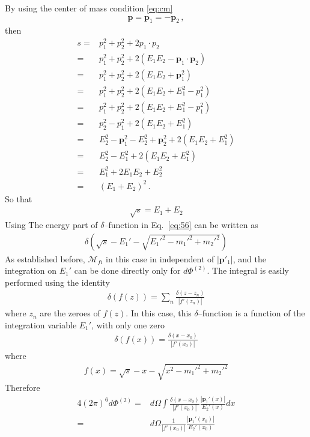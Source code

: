By using the center of mass condition \eqref{eq:cm}
\begin{align}
  \mathbf{p}=\mathbf{p}_1=-\mathbf{p}_2\,,
\end{align}
then
\begin{align}
   s=& p_1^2+p_2^2+2 p_1\cdot p_2 \nonumber\\
=&  p_1^2+p_2^2+2  \left( E_1 E_2-\mathbf{p}_1\cdot\mathbf{p}_2 \right)\nonumber\\
=& p_1^2+p_2^2+2\left( E_1 E_2+\mathbf{p}_1^2 \right) \nonumber\\
=& p_1^2+p_2^2+2\left( E_1 E_2+ E_1^2-p_1^2 \right) \nonumber\\
=& p_1^2+p_2^2+2\left( E_1 E_2+ E_1^2-p_1^2 \right) \nonumber\\
=& p_2^2-p_1^2+2\left( E_1 E_2+ E_1^2 \right) \nonumber\\
=& E_2^2-\mathbf{p}_1^2-E_2^2+\mathbf{p}_2^2+2\left( E_1 E_2+ E_1^2 \right) \nonumber\\
=& E_2^2-E_1^2+2\left( E_1 E_2+ E_1^2 \right) \nonumber\\
=& E_1^2 +2E_1 E_2+ E_2^2 \nonumber\\
=& \left( E_1+E_2 \right)^2\,.
\end{align}
So that
\begin{align}
  \label{eq:60}
  \sqrt{s}=E_1+E_2
\end{align}
Using The energy part of $\delta$--function in Eq.~\eqref{eq:56} can be written as
\begin{align}
  \delta\left(\sqrt{s}-E_1'-\sqrt{{E_1'}^2-{m_1'}^2+{m_2'}^2}\right)
\end{align}
As established before,  $\mathcal{M}_{fi}$ in this case in independent of $|\mathbf{p}'_1|$, and the integration on $E_1'$ can be done directly only for $d\Phi^{(2)}$.
The integral is easily performed using the identity
\begin{align}
  \delta\left(f(z)\right)=\sum_n\frac{\delta(z-z_n)}{|f'(z_n)|}
\end{align}
where $z_n$ are the zeroes of $f(z)$. In this case, this $\delta$--function is a function of the integration variable $E_1'$, with only one zero
\begin{align}
   \delta\left(f(x)\right)=\frac{\delta(x-x_0)}{|f'(x_0)|}
\end{align}
where
\begin{align}
  f(x)=\sqrt{s}-x-\sqrt{x^2-{m_1'}^2+{m_2'}^2}
\end{align}
Therefore
\begin{align}
  \label{eq:61}
   4(2\pi)^6d\Phi^{(2)}=&d\Omega\int\frac{\delta(x-x_0)}{|f'(x_0)|}\frac{
     |\mathbf{p}_1'(x)|}{E_2'(x)}dx\nonumber\\
   =&d\Omega\frac{1}{|f'(x_0)|}\frac{
     |\mathbf{p}_1'(x_0)|}{E_2'(x_0)}\nonumber\\
\end{align}
